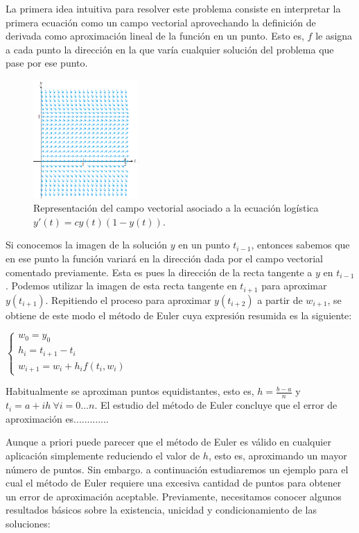\documentclass{article}
\theoremstyle{theorem-style}  %
\theoremstyle{definition}
\theoremstyle{example-style}
\begin{document}
	La primera idea intuitiva para resolver este problema consiste en interpretar la primera ecuación como un campo vectorial aprovechando la definición de derivada como aproximación lineal de la función en un punto. Esto es, $f$ le asigna a cada punto la dirección en la que varía cualquier solución del problema que pase por ese punto.

	\begin{figure}[h]
		\centering
		\includegraphics[width=4cm]{./Images/interpret-pvi.png}
		\caption{Representación del campo vectorial asociado a la ecuación logística $y'(t) = c y(t) (1 - y(t))$.} 
		\label{fig:interpret-pvi}
	\end{figure}

	Si conocemos la imagen de la solución $y$ en un punto $t_{i-1}$, entonces sabemos que en ese punto la función variará en la dirección dada por el campo vectorial comentado previamente. Esta es pues la dirección de la recta tangente a $y$ en $t_{i-1}$. Podemos utilizar la imagen de esta recta tangente en $t_{i+1}$ para aproximar $y(t_{i+1})$. Repitiendo el proceso para aproximar $y(t_{i+2})$ a partir de $w_{i+1}$, se obtiene de este modo el método de Euler cuya expresión resumida es la siguiente:

	\begin{center}
		$\begin{cases}
		w_0=y_0 \\
		h_{i} = t_{i+1} - t_i \\
		w_{i+1} = w_i + h_{i} f(t_i,w_i)
		\end{cases}$
	\end{center}
	
	Habitualmente se aproximan puntos equidistantes, esto es, $h = \frac{b-a}{n}$ y $t_i = a + ih \ \forall i = 0 \ldots n$. El estudio del método de Euler concluye que el error de aproximación es.............
	
	Aunque a priori puede parecer que el método de Euler es válido en cualquier aplicación simplemente reduciendo el valor de $h$, esto es, aproximando un mayor número de puntos. Sin embargo. a continuación estudiaremos un ejemplo para el cual el método de Euler requiere una excesiva cantidad de puntos para obtener un error de aproximación aceptable. Previamente, necesitamos conocer algunos resultados básicos sobre la existencia, unicidad y condicionamiento de las soluciones:
	
\end{document}
